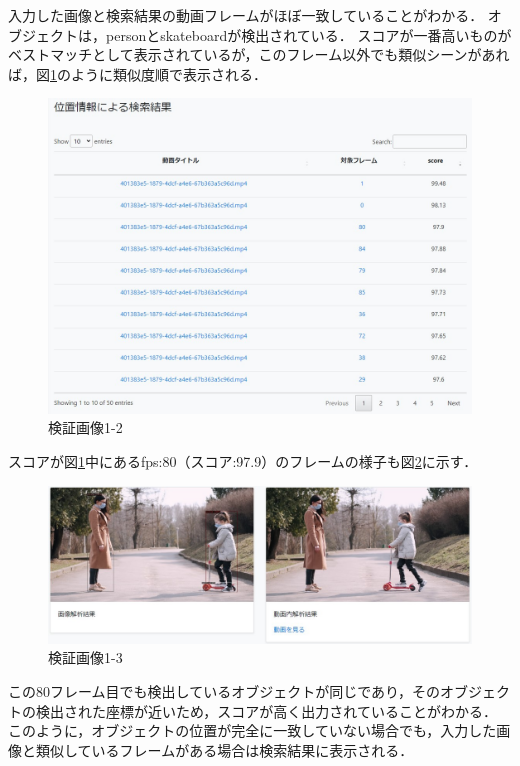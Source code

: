 \documentclass[a4j,12pt,dvipdfmx]{jreport}
\begin{document}
入力した画像と検索結果の動画フレームがほぼ一致していることがわかる．
オブジェクトは，personとskateboardが検出されている．
スコアが一番高いものがベストマッチとして表示されているが，このフレーム以外でも類似シーンがあれば，図\ref{fig:img_1-1-1}のように類似度順で表示される．
\begin{figure}[b]
  \centering
  \includegraphics[width=13cm]{image/result_1_1_1.jpg}
  \caption{検証画像1-2}
  \label{fig:img_1-1-1}
\end{figure}

スコアが図\ref{fig:img_1-1-1}中にあるfps:80（スコア:97.9）のフレームの様子も図\ref{fig:img_1-1-2}に示す．
\begin{figure}[b]
  \centering
  \includegraphics[width=13cm]{image/result_1_1_2.jpg}
  \caption{検証画像1-3}
  \label{fig:img_1-1-2}
\end{figure}

この80フレーム目でも検出しているオブジェクトが同じであり，そのオブジェクトの検出された座標が近いため，スコアが高く出力されていることがわかる．
このように，オブジェクトの位置が完全に一致していない場合でも，入力した画像と類似しているフレームがある場合は検索結果に表示される．
\end{document}
